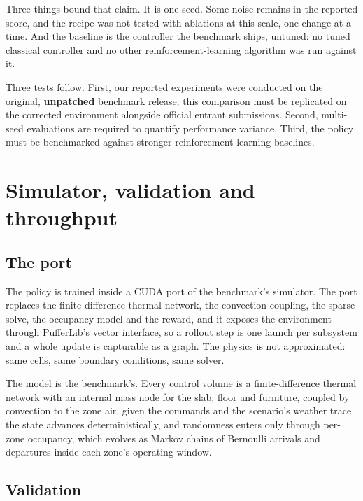 \documentclass{article}
\begin{document}
Three things bound that claim. It is one seed. Some noise remains in the reported score, and the recipe was not tested with ablations at this scale, one change at a time. And the baseline is the controller the benchmark ships, untuned: no tuned classical controller and no other reinforcement-learning algorithm was run against it.

Three tests follow. First, our reported experiments were conducted on the original, \textbf{unpatched} benchmark release; this comparison must be replicated on the corrected environment alongside official entrant submissions. Second, multi-seed evaluations are required to quantify performance variance. Third, the policy must be benchmarked against stronger reinforcement learning baselines.


\clearpage

\nocite{*}


\clearpage
\appendix

\section{Simulator, validation and throughput}
\label{app:sim}

\subsection{The port}
\label{app:port}

The policy is trained inside a CUDA port of the benchmark's simulator. The port replaces the finite-difference thermal network, the convection coupling, the sparse solve, the occupancy model and the reward, and it exposes the environment through PufferLib's vector interface, so a rollout step is one launch per subsystem and a whole update is capturable as a graph. The physics is not approximated: same cells, same boundary conditions, same solver.

The model is the benchmark's. Every control volume is a finite-difference thermal network with an internal mass node for the slab, floor and furniture, coupled by convection to the zone air, given the commands and the scenario's weather trace the state advances deterministically, and randomness enters only through per-zone occupancy, which evolves as Markov chains of Bernoulli arrivals and departures inside each zone's operating window.

\subsection{Validation}
\label{app:validation}
\end{document}
